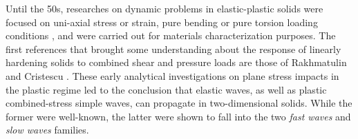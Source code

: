 Until the 50s, researches on dynamic problems in elastic-plastic solids were focused on uni-axial stress or strain, pure bending or pure torsion loading conditions \cite{Taylor,vonKarman}, and were carried out for materials characterization purposes.
The first references that brought some understanding about the response of linearly hardening solids to combined shear and pressure loads are those of Rakhmatulin \cite{Rakhmatulin} and Cristescu \cite{CRISTESCU19591605}.
These early analytical investigations on plane stress impacts in the plastic regime led to the conclusion that elastic waves, as well as plastic combined-stress simple waves, can propagate in two-dimensional solids. 
While the former were well-known, the latter were shown to fall into the two \textit{fast waves} and \textit{slow waves} families.

